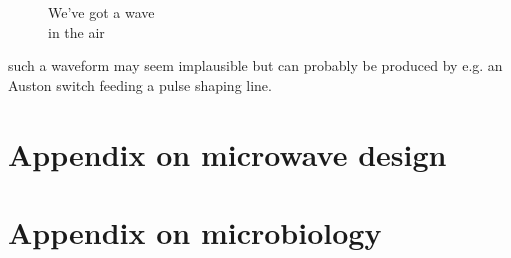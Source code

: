 \documentclass[fleqn,10pt]{article}
\begin{document}
\begin{figure}[H]
	\captionsetup{singlelinecheck = false, justification=justified}
	\centering
	
	\caption{
		We've got a wave\\
		in the air}
\end{figure}



such a waveform may seem implausible but can probably be produced by e.g. an Auston switch feeding a pulse shaping line.


\clearpage
















\clearpage





%











%












\section{Appendix on microwave design}



\section{Appendix on microbiology}











\nocite{*}


\end{document}
